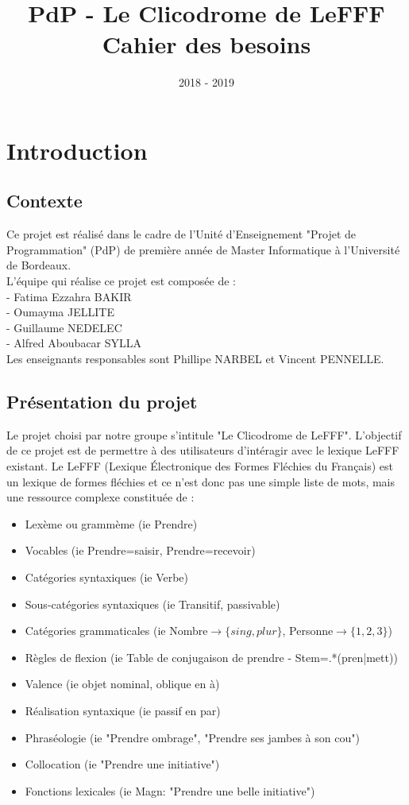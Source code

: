 \documentclass{article}
\title{PdP - Le Clicodrome de LeFFF \\ Cahier des besoins}
\author{}
\date{2018 - 2019}
\begin{document}
\maketitle

\section{Introduction}
\subsection{Contexte}
Ce projet est réalisé dans le cadre de l'Unité d'Enseignement "Projet de Programmation" (PdP) de première année de Master Informatique à l'Université de Bordeaux.
\\  
L'équipe qui réalise ce projet est composée de : \\ 
- Fatima Ezzahra BAKIR \\ 
- Oumayma JELLITE \\ 
- Guillaume NEDELEC \\ 
- Alfred Aboubacar SYLLA \\
Les enseignants responsables sont Phillipe NARBEL et Vincent PENNELLE.

\subsection{Présentation du projet}
Le projet choisi par notre groupe s'intitule "Le Clicodrome de LeFFF". L'objectif de ce projet est de permettre à des utilisateurs d'intéragir avec le lexique LeFFF existant. 
Le LeFFF (Lexique Électronique des Formes Fléchies du Français) est un lexique de formes fléchies et ce n'est donc pas une simple liste de mots, mais une ressource complexe constituée de :
\begin{itemize}  
  \item Lexème ou grammème (ie Prendre)
  \item Vocables (ie Prendre=saisir, Prendre=recevoir)
  \item Catégories syntaxiques (ie Verbe)
  \item Sous-catégories syntaxiques (ie Transitif, passivable)
  \item Catégories grammaticales (ie Nombre$\rightarrow\{sing, plur\}$, Personne$\rightarrow\{1, 2, 3\}$)
  \item Règles de flexion (ie Table de conjugaison de prendre - Stem=.*(pren|mett))
  \item Valence (ie objet nominal, oblique en à)
  \item Réalisation syntaxique (ie passif en par)
  \item Phraséologie (ie "Prendre ombrage", "Prendre ses jambes à son cou")
  \item Collocation (ie "Prendre une initiative")
  \item Fonctions lexicales (ie Magn: "Prendre une belle initiative")
\end{itemize}
\end{document}
